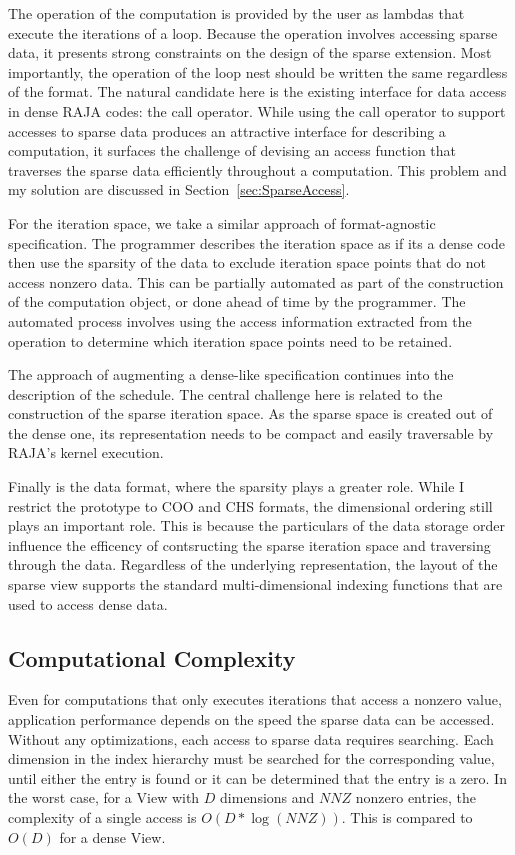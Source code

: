The operation of the computation is provided by the user as lambdas that execute the iterations of a loop. 
Because the operation involves accessing sparse data, it presents strong constraints on the design of the sparse extension. 
Most importantly, the operation of the loop nest should be written the same regardless of the format. 
The natural candidate here is the existing interface for data access in dense RAJA codes: the call operator. 
While using the call operator to support accesses to sparse data produces an attractive interface for describing a computation, it surfaces the challenge of devising an access function that traverses the sparse data efficiently throughout a computation. This problem and my solution are discussed in Section~\ref{sec:SparseAccess}.

For the iteration space, we take a similar approach of format-agnostic specification.
The programmer describes the iteration space as if its a dense code then use the sparsity of the data to exclude iteration space points that do not access nonzero data.
This can be partially automated as part of the construction of the computation object, or done ahead of time by the programmer.
The automated process involves using the access information extracted from the operation to determine which iteration space points need to be retained.

The approach of augmenting a dense-like specification continues into the description of the schedule. 
The central challenge here is related to the construction of the sparse iteration space. 
As the sparse space is created out of the dense one, its representation needs to be compact and easily traversable by RAJA's kernel execution. 

Finally is the data format, where the sparsity plays a greater role.
While I restrict the prototype to COO and CHS formats, the dimensional ordering still plays an important role.
This is because the particulars of the data storage order influence the efficency of contsructing the sparse iteration space and traversing through the data.
Regardless of the underlying representation, the layout of the sparse view supports the standard multi-dimensional indexing functions that are used to access dense data.

\subsection{Computational Complexity}

Even for computations that only executes iterations that access a nonzero value, application performance depends on the speed the sparse data can be accessed.
Without any optimizations, each access to sparse data requires searching. 
Each dimension in the index hierarchy must be searched for the corresponding value, until either the entry is found or it can be determined that the entry is a zero.
In the worst case, for a View with $D$ dimensions and $NNZ$ nonzero entries, the complexity of a single access is $O(D * \log(NNZ))$. 
This is compared to $O(D)$ for a dense View.

